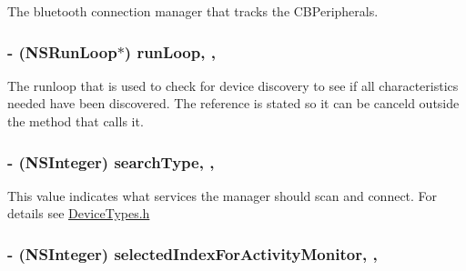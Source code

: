 The bluetooth connection manager that tracks the C\-B\-Peripherals. \hypertarget{interface_b_t_device_manager_a2f3ce5cb472e8f042d4b427518d0ffea}{
\subsubsection[{run\-Loop}]{\setlength{\rightskip}{0pt plus 5cm}-\/ (N\-S\-Run\-Loop$\ast$) run\-Loop\hspace{0.3cm}{\ttfamily [read]}, {\ttfamily [write]}, {\ttfamily [atomic]}}}\label{interface_b_t_device_manager_a2f3ce5cb472e8f042d4b427518d0ffea}
The runloop that is used to check for device discovery to see if all characteristics needed have been discovered. The reference is stated so it can be canceld outside the method that calls it. \hypertarget{interface_b_t_device_manager_a610db66209e9d142e5451ceedc3c6a36}{
\subsubsection[{search\-Type}]{\setlength{\rightskip}{0pt plus 5cm}-\/ (N\-S\-Integer) search\-Type\hspace{0.3cm}{\ttfamily [read]}, {\ttfamily [write]}, {\ttfamily [atomic]}}}\label{interface_b_t_device_manager_a610db66209e9d142e5451ceedc3c6a36}
This value indicates what services the manager should scan and connect. For details see \hyperlink{_device_types_8h_source}{Device\-Types.\-h} \hypertarget{interface_b_t_device_manager_a8e47d59f0a40f8d96f4fea826be853d1}{
\subsubsection[{selected\-Index\-For\-Activity\-Monitor}]{\setlength{\rightskip}{0pt plus 5cm}-\/ (N\-S\-Integer) selected\-Index\-For\-Activity\-Monitor\hspace{0.3cm}{\ttfamily [read]}, {\ttfamily [write]}, {\ttfamily [atomic]}}}\label{interface_b_t_device_manager_a8e47d59f0a40f8d96f4fea826be853d1}
